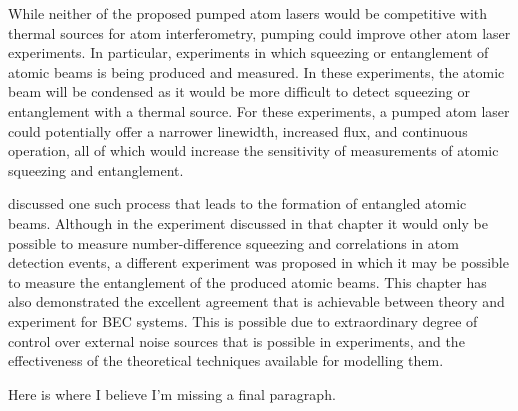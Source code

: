 While neither of the proposed pumped atom lasers would be competitive with thermal sources for atom interferometry, pumping could improve other atom laser experiments.  In particular, experiments in which squeezing or entanglement of atomic beams is being produced and measured.  In these experiments, the atomic beam will be condensed as it would be more difficult to detect squeezing or entanglement with a thermal source.  For these experiments, a pumped atom laser could potentially offer a narrower linewidth, increased flux, and continuous operation, all of which would increase the sensitivity of measurements of atomic squeezing and entanglement.

 discussed one such process that leads to the formation of entangled atomic beams.  Although in the experiment discussed in that chapter it would only be possible to measure number-difference squeezing and correlations in atom detection events, a different experiment was proposed in which it may be possible to measure the entanglement of the produced atomic beams.  This chapter has also demonstrated the excellent agreement that is achievable between theory and experiment for BEC systems.  This is possible due to extraordinary degree of control over external noise sources that is possible in experiments, and the effectiveness of the theoretical techniques available for modelling them.

Here is where I believe I'm missing a final paragraph.







